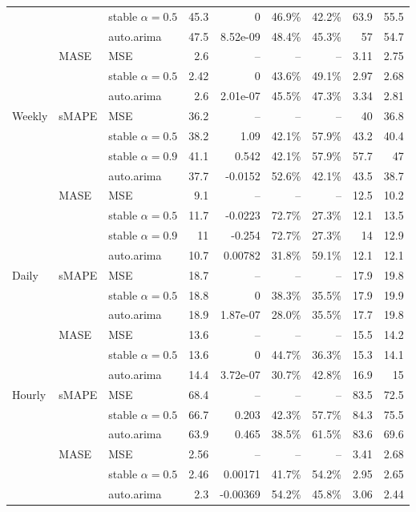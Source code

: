 \begin{tabular}{lllrrrrrr}
 &  & stable $\alpha=0.5$ & 45.3 & 0 & 46.9\% & 42.2\% & 63.9 & 55.5 \\
 &  & auto.arima & 47.5 & 8.52e-09 & 48.4\% & 45.3\% & 57 & 54.7 \\
 & MASE & MSE & 2.6 & -- & -- & -- & 3.11 & 2.75 \\
 &  & stable $\alpha=0.5$ & 2.42 & 0 & 43.6\% & 49.1\% & 2.97 & 2.68 \\
 &  & auto.arima & 2.6 & 2.01e-07 & 45.5\% & 47.3\% & 3.34 & 2.81 \\
\addlinespace
Weekly & sMAPE & MSE & 36.2 & -- & -- & -- & 40 & 36.8 \\
 &  & stable $\alpha=0.5$ & 38.2 & 1.09 & 42.1\% & 57.9\% & 43.2 & 40.4 \\
 &  & stable $\alpha=0.9$ & 41.1 & 0.542 & 42.1\% & 57.9\% & 57.7 & 47 \\
 &  & auto.arima & 37.7 & -0.0152 & 52.6\% & 42.1\% & 43.5 & 38.7 \\
 & MASE & MSE & 9.1 & -- & -- & -- & 12.5 & 10.2 \\
 &  & stable $\alpha=0.5$ & 11.7 & -0.0223 & 72.7\% & 27.3\% & 12.1 & 13.5 \\
 &  & stable $\alpha=0.9$ & 11 & -0.254 & 72.7\% & 27.3\% & 14 & 12.9 \\
 &  & auto.arima & 10.7 & 0.00782 & 31.8\% & 59.1\% & 12.1 & 12.1 \\
\addlinespace
Daily & sMAPE & MSE & 18.7 & -- & -- & -- & 17.9 & 19.8 \\
 &  & stable $\alpha=0.5$ & 18.8 & 0 & 38.3\% & 35.5\% & 17.9 & 19.9 \\
 &  & auto.arima & 18.9 & 1.87e-07 & 28.0\% & 35.5\% & 17.7 & 19.8 \\
 & MASE & MSE & 13.6 & -- & -- & -- & 15.5 & 14.2 \\
 &  & stable $\alpha=0.5$ & 13.6 & 0 & 44.7\% & 36.3\% & 15.3 & 14.1 \\
 &  & auto.arima & 14.4 & 3.72e-07 & 30.7\% & 42.8\% & 16.9 & 15 \\
\addlinespace
Hourly & sMAPE & MSE & 68.4 & -- & -- & -- & 83.5 & 72.5 \\
 &  & stable $\alpha=0.5$ & 66.7 & 0.203 & 42.3\% & 57.7\% & 84.3 & 75.5 \\
 &  & auto.arima & 63.9 & 0.465 & 38.5\% & 61.5\% & 83.6 & 69.6 \\
 & MASE & MSE & 2.56 & -- & -- & -- & 3.41 & 2.68 \\
 &  & stable $\alpha=0.5$ & 2.46 & 0.00171 & 41.7\% & 54.2\% & 2.95 & 2.65 \\
 &  & auto.arima & 2.3 & -0.00369 & 54.2\% & 45.8\% & 3.06 & 2.44 \\
\bottomrule
\end{tabular}
